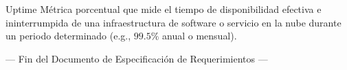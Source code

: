 \begin{GlossaryBox}{Uptime}
    Métrica porcentual que mide el tiempo de disponibilidad efectiva e ininterrumpida de una infraestructura de software o servicio en la nube durante un periodo determinado (e.g., $99.5\%$ anual o mensual).
\end{GlossaryBox}

\vspace{0.8cm}
\begin{center}
    \small\sffamily\textcolor{MutedText}{--- Fin del Documento de Especificación de Requerimientos ---}
\end{center}
